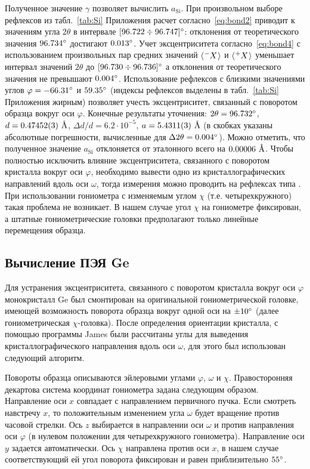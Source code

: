 Полученное значение $\gamma$ позволяет вычислить $a_\text{Si}$.
При произвольном выборе рефлексов из табл.~\ref{tab:Si} Приложения расчет согласно~\ref{eq:bond2} приводит к значениям угла $2\theta$ в интервале $[96.722\div96.747]^\circ$: отклонения от теоретического значения $96.734^\circ$ достигают $0.013^\circ$.
Учет эксцентриситета согласно~\ref{eq:bond4} с использованием произвольных пар средних значений $\left<\tensor*[^-]{X}{}\right>$ и $\left<\tensor*[^+]{X}{}\right>$ уменьшает интервал значений $2\theta$ до $[96.730\div96.736]^\circ$ а отклонения от теоретического значения не превышают $0.004^\circ$.
Использование рефлексов с близкими значениями углов $\varphi = -66.31^\circ$ и $59.35^\circ$ (индексы рефлексов выделены в табл.~\ref{tab:Si} Приложения жирным) позволяет учесть эксцентриситет, связанный с поворотом образца вокруг оси $\varphi$.
Конечные результаты уточнения: $2\theta = 96.732^\circ$, $d = 0.47452 (3)\ \text{\AA}$, $\Delta d / d = 6.2 \cdot 10^{-5}$, $a = 5.4311(3)\ \text{\AA}$ (в скобках указаны абсолютные погрешности, вычисленные для $\Delta 2 \theta = 0.004^\circ$).
Можно отметить, что полученное значение $a_\text{Si}$ отклоняется от эталонного всего на $0.00006\ \text{\AA}$.
Чтобы полностью исключить влияние эксцентриситета, связанного с поворотом кристалла вокруг оси $\varphi$, необходимо вывести одно из кристаллографических направлений вдоль оси $\omega$, тогда измерения можно проводить на рефлексах типа .
При использовании гониометра с изменяемым углом $\chi$ (т.е. четырехкружного) такая проблема не возникает.
В нашем случае угол $\chi$ на гониометре фиксирован, а штатные гониометрические головки предполагают только линейные перемещения образца.

\subsection{Вычисление ПЭЯ Ge}

Для устранения эксцентриситета, связанного с поворотом кристалла вокруг оси $\varphi$ монокристалл Ge был смонтирован на оригинальной гониометрической головке, имеющей возможность поворота образца вокруг одной оси на $\pm 10^\circ$ (далее гониометрическая $\chi$-головка).
После определения ориентации кристалла, с помощью программы James были рассчитаны углы для выведения кристаллографического направления вдоль оси $\omega$, для этого был использован следующий алгоритм.

Повороты образца описываются эйлеровыми углами $\varphi$, $\omega$ и $\chi$.
Правосторонняя декартова система координат гониометра задана следующим образом.
Направление оси $x$ совпадает с направлением первичного пучка.
Если смотреть навстречу $x$, то положительным изменением угла $\omega$ будет вращение против часовой стрелки.
Ось $z$ выбирается в направлении оси $\omega$ и против направления оси $\varphi$ (в нулевом положении для четырехкружного гониометра).
Направление оси $y$ задается автоматически.
Ось $\chi$ направлена против оси $x$, в нашем случае соответствующий ей угол поворота фиксирован и равен приблизительно $55^\circ$.

